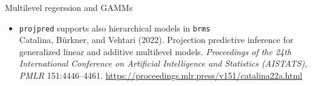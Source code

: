 \documentclass[t]{beamer}
\begin{document}
  



  

  



\begin{frame}{Multilevel regerssion and GAMMs}
  

  \begin{itemize}
  \item \texttt{projpred} supports also hierarchical models in \texttt{brms}\\
  {\small  Catalina, Bürkner, and Vehtari (2022). Projection predictive inference for generalized linear and additive multilevel models. \textit{Proceedings of the 24th International Conference on Artificial Intelligence and Statistics (AISTATS), PMLR} 151:4446–4461. \url{https://proceedings.mlr.press/v151/catalina22a.html}}
  \end{itemize}
  
\end{frame}
\end{document}
